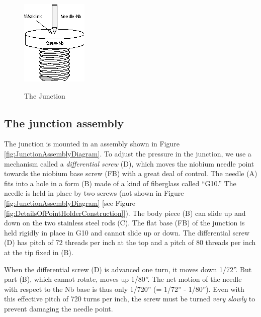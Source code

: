 \documentclass{../lab}
\begin{document}
\begin{figure}[h]
    \centering
    \href{http://experimentationlab.berkeley.edu/sites/default/files/images/JOS4.gif}{\includegraphics[width=0.3\linewidth]{images/JOS4.png}}
    \caption{The Junction}
    \label{fig:junction}
\end{figure}

\subsection{The junction assembly}

The junction is mounted in an assembly shown in Figure \ref{fig:JunctionAssemblyDiagram}. To adjust the pressure in the junction, we use a mechanism called a \emph{differential screw }(D)\emph{,} which moves the niobium needle point towards the niobium base screw (FB) with a great deal of control. The needle (A) fits into a hole in a form (B) made of a kind of fiberglass called ``G10.'' The needle is held in place by two screws (not shown in Figure \ref{fig:JunctionAssemblyDiagram} [see Figure \ref{fig:DetailsOfPointHolderConstruction}]). The body piece (B) can slide up and down on the two stainless steel rods (C). The flat base (FB) of the junction is held rigidly in place in G10 and cannot slide up or down. The differential screw (D) has pitch of 72 threads per inch at the top and a pitch of 80 threads per inch at the tip fixed in (B).

When the differential screw (D) is advanced one turn, it moves down 1/72''. But part (B), which cannot rotate, moves up 1/80''. The net motion of the needle with respect to the Nb base is thus only 1/720'' (= 1/72'' - 1/80''). Even with this effective pitch of 720 turns per inch, the screw must be turned \emph{very slowly} to prevent damaging the needle point.
\end{document}
